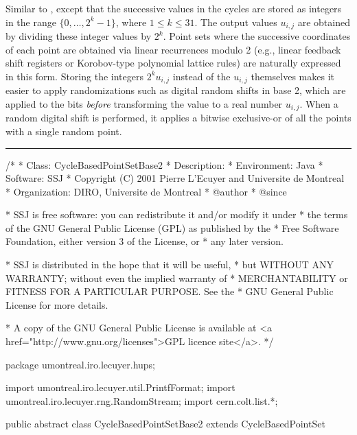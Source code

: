 
Similar to , except that the successive
values in the cycles are stored as integers in the range
$\{0,\dots,2^k-1\}$, where $1\le k \le 31$.
The output values $u_{i,j}$ are obtained by dividing these integer
values by $2^k$.  Point sets where the successive coordinates of each
point are obtained via linear recurrences modulo 2 (e.g., linear feedback
shift registers or Korobov-type polynomial lattice rules)
are naturally expressed in this form.
Storing the integers $2^k u_{i,j}$ instead of the $u_{i,j}$ themselves
makes it easier to apply randomizations such as digital random shifts
in base 2, which are applied to the bits \emph{before} transforming
the value to a real number $u_{i,j}$. When a random digital shift is
performed, it applies a bitwise exclusive-or of all the points with a single
  random point.

\bigskip\hrule\bigskip

\begin{code}
\begin{hide}
/*
 * Class:        CycleBasedPointSetBase2
 * Description:  
 * Environment:  Java
 * Software:     SSJ 
 * Copyright (C) 2001  Pierre L'Ecuyer and Universite de Montreal
 * Organization: DIRO, Universite de Montreal
 * @author       
 * @since

 * SSJ is free software: you can redistribute it and/or modify it under
 * the terms of the GNU General Public License (GPL) as published by the
 * Free Software Foundation, either version 3 of the License, or
 * any later version.

 * SSJ is distributed in the hope that it will be useful,
 * but WITHOUT ANY WARRANTY; without even the implied warranty of
 * MERCHANTABILITY or FITNESS FOR A PARTICULAR PURPOSE.  See the
 * GNU General Public License for more details.

 * A copy of the GNU General Public License is available at
   <a href="http://www.gnu.org/licenses">GPL licence site</a>.
 */
\end{hide}
package umontreal.iro.lecuyer.hups;\begin{hide}

import umontreal.iro.lecuyer.util.PrintfFormat;
import umontreal.iro.lecuyer.rng.RandomStream;
import cern.colt.list.*;
\end{hide}

public abstract class CycleBasedPointSetBase2 extends CycleBasedPointSet\begin{hide} {

// dim = Integer.MAX_VALUE;     // Dimension is infinite.
   private int[] digitalShift;  // Digital shift, initially zero (null).
                                // Entry j is for dimension j.
   protected int numBits;       // Number of bits in stored values.
   protected double normFactor; // To convert output to (0,1); 1/2^numBits.

\end{hide}
\end{code}

